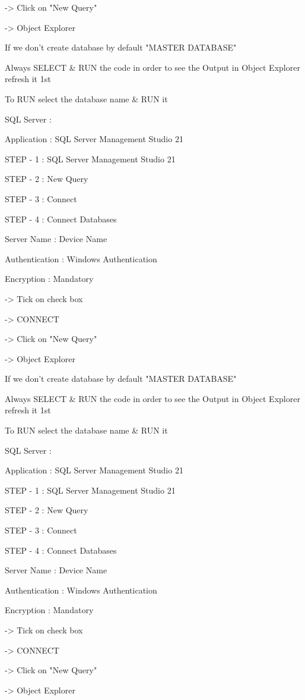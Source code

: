 -> Click on "New Query"

-> Object Explorer


If we don't create database by default "MASTER DATABASE"


Always SELECT & RUN the code in order to see the Output in Object Explorer refresh it 1st


To RUN select the database name & RUN it

SQL Server :

Application : SQL Server Management Studio 21

STEP - 1 : SQL Server Management Studio 21

STEP - 2 : New Query

STEP - 3 : Connect

STEP - 4 : Connect Databases


Server Name : Device Name

Authentication : Windows Authentication

Encryption : Mandatory

-> Tick on check box

-> CONNECT

-> Click on "New Query"

-> Object Explorer


If we don't create database by default "MASTER DATABASE"


Always SELECT & RUN the code in order to see the Output in Object Explorer refresh it 1st


To RUN select the database name & RUN it

SQL Server :

Application : SQL Server Management Studio 21

STEP - 1 : SQL Server Management Studio 21

STEP - 2 : New Query

STEP - 3 : Connect

STEP - 4 : Connect Databases


Server Name : Device Name

Authentication : Windows Authentication

Encryption : Mandatory

-> Tick on check box

-> CONNECT

-> Click on "New Query"

-> Object Explorer


